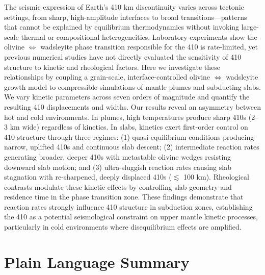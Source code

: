 \documentclass[
  paper=a4,
  ,captions=tableheading
]{scrartcl}
\begin{document}
The seismic expression of Earth's 410 km discontinuity varies across
tectonic settings, from sharp, high-amplitude interfaces to broad
transitions---patterns that cannot be explained by equilibrium
thermodynamics without invoking large-scale thermal or compositional
heterogeneities. Laboratory experiments show the olivine
\(\Leftrightarrow\) wadsleyite phase transition responsible for the 410
is rate-limited, yet previous numerical studies have not directly
evaluated the sensitivity of 410 structure to kinetic and rheological
factors. Here we investigate these relationships by coupling a
grain-scale, interface-controlled olivine \(\Leftrightarrow\) wadsleyite
growth model to compressible simulations of mantle plumes and subducting
slabs. We vary kinetic parameters across seven orders of magnitude and
quantify the resulting 410 displacements and widths. Our results reveal
an asymmetry between hot and cold environments. In plumes, high
temperatures produce sharp 410s (2--3 km wide) regardless of kinetics.
In slabs, kinetics exert first-order control on 410 structure through
three regimes: (1) quasi-equilibrium conditions producing narrow,
uplifted 410s and continuous slab descent; (2) intermediate reaction
rates generating broader, deeper 410s with metastable olivine wedges
resisting downward slab motion; and (3) ultra-sluggish reaction rates
causing slab stagnation with re-sharpened, deeply displaced 410s
(\(\lesssim\) 100 km). Rheological contrasts modulate these kinetic
effects by controlling slab geometry and residence time in the phase
transition zone. These findings demonstrate that reaction rates strongly
influence 410 structure in subduction zones, establishing the 410 as a
potential seismological constraint on upper mantle kinetic processes,
particularly in cold environments where disequilibrium effects are
amplified.

\section*{Plain Language Summary}\label{sec:plain-language-summary}
\end{document}
